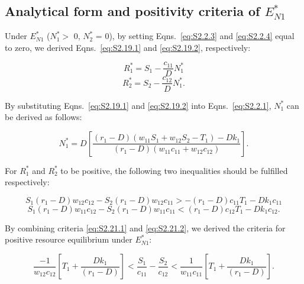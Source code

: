 \subsection{Analytical form and positivity criteria of $E_{N1}^{*}$} 
Under \textbf{$E_{N1}^{*}$} ($N_{1}^{*} >$  0, $N_{2}^{*}$ = 0), by setting Eqns.~\ref{eq:S2.2.3} and \ref{eq:S2.2.4} equal to zero, we derived Eqns.~\ref{eq:S2.19.1} and \ref{eq:S2.19.2}, respectively:

\begin{equation}
R_{1}^{*} = S_1-\frac{c_{11}}{D}N_{1}^{*}
\tag{S2.19.1}\label{eq:S2.19.1}
\end{equation}
\begin{equation}
R_{2}^{*} = S_2-\frac{c_{12}}{D}N_{1}^{*}.
\tag{S2.19.2}\label{eq:S2.19.2}
\end{equation}

\noindent By substituting Eqns.~\ref{eq:S2.19.1} and \ref{eq:S2.19.2} into Eqns.~\ref{eq:S2.2.1}, $N_{1}^{*}$ can be derived as follows:

\begin{equation}
N_{1}^{*} = D\left [\frac{\left ( r_1 - D\right )\left ( w_{11}S_{1}+w_{12}S_{2}-T_{1} \right )-Dk_{1}}{\left ( r_1-D \right )\left (  w_{11}c_{11}+w_{12}c_{12} \right )}\right].
\tag{S2.20}\label{eq:S2.20}
\end{equation}

\noindent For $R_{1}^{*}$ and $R_{2}^{*}$ to be positive, the following two inequalities should be fulfilled respectively:

\begin{equation}
S_1\left ( r_{1}-D \right )w_{12}c_{12} - S_2\left ( r_1-D \right )w_{12}c_{11} > -\left ( r_{1}-D \right )c_{11}T_{1} - Dk_{1}c_{11}
\tag{S2.21.1}\label{eq:S2.21.1}
\end{equation}
\begin{equation}
S_1\left ( r_{1}-D \right )w_{11}c_{12} - S_2\left ( r_1-D \right )w_{11}c_{11} < \left ( r_{1}-D \right )c_{12}T_{1} - Dk_{1}c_{12}.
\tag{S2.21.2}\label{eq:S2.21.2}
\end{equation}

By combining criteria \ref{eq:S2.21.1} and \ref{eq:S2.21.2}, we derived the criteria for positive resource equilibrium under $E_{N1}^{*}$:

\begin{equation}
\frac{-1}{w_{12}c_{12}}\left [ T_{1} + \frac{Dk_{1}}{\left ( r_{1}-D \right )}\right ] < \frac{S_1}{c_{11}}-\frac{S_2}{c_{12}} < \frac{1}{w_{11}c_{11}}\left [ T_{1} + \frac{Dk_{1}}{\left ( r_{1}-D \right )}\right ].
\tag{S2.22}\label{eq:S2.22}
\end{equation}



